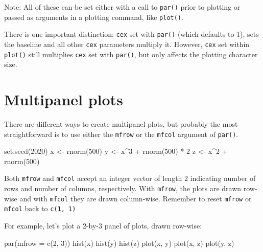 \documentclass[
]{book}
\newenvironment{Shaded}{\begin{snugshade}}{\end{snugshade}}
\newcommand{\AttributeTok}[1]{\textcolor[rgb]{0.77,0.63,0.00}{#1}}
\newcommand{\DecValTok}[1]{\textcolor[rgb]{0.00,0.00,0.81}{#1}}
\newcommand{\FunctionTok}[1]{\textcolor[rgb]{0.00,0.00,0.00}{#1}}
\newcommand{\NormalTok}[1]{#1}
\newcommand{\OtherTok}[1]{\textcolor[rgb]{0.56,0.35,0.01}{#1}}
\newcommand{\SpecialCharTok}[1]{\textcolor[rgb]{0.00,0.00,0.00}{#1}}
\begin{document}
Note: All of these can be set either with a call to \texttt{par()} prior to plotting or passed as arguments in a plotting command, like \texttt{plot()}.

There is one important distinction: \texttt{cex} set with \texttt{par()} (which defaults to 1), sets the baseline and all other \texttt{cex} parameters multiply it. However, \texttt{cex} set within \texttt{plot()} still multiplies \texttt{cex} set with \texttt{par()}, but only affects the plotting character size.

\hypertarget{multipanel-plots}{%
\section{Multipanel plots}\label{multipanel-plots}}

There are different ways to create multipanel plots, but probably the most straightforward is to use either the \texttt{mfrow} or the \texttt{mfcol} argument of \texttt{par()}.

\begin{Shaded}
\begin{Highlighting}[]
\FunctionTok{set.seed}\NormalTok{(}\DecValTok{2020}\NormalTok{)}
\NormalTok{x }\OtherTok{\textless{}{-}} \FunctionTok{rnorm}\NormalTok{(}\DecValTok{500}\NormalTok{)}
\NormalTok{y }\OtherTok{\textless{}{-}}\NormalTok{ x}\SpecialCharTok{\^{}}\DecValTok{3} \SpecialCharTok{+} \FunctionTok{rnorm}\NormalTok{(}\DecValTok{500}\NormalTok{) }\SpecialCharTok{*} \DecValTok{2}
\NormalTok{z }\OtherTok{\textless{}{-}}\NormalTok{ x}\SpecialCharTok{\^{}}\DecValTok{2} \SpecialCharTok{+} \FunctionTok{rnorm}\NormalTok{(}\DecValTok{500}\NormalTok{)}
\end{Highlighting}
\end{Shaded}

Both \texttt{mfrow} and \texttt{mfcol} accept an integer vector of length 2 indicating number of rows and number of columns, respectively. With \texttt{mfrow}, the plots are drawn row-wise and with \texttt{mfcol} they are drawn column-wise. Remember to reset \texttt{mfrow} or \texttt{mfcol} back to \texttt{c(1,\ 1)}

For example, let's plot a 2-by-3 panel of plots, drawn row-wise:

\begin{Shaded}
\begin{Highlighting}[]
\FunctionTok{par}\NormalTok{(}\AttributeTok{mfrow =} \FunctionTok{c}\NormalTok{(}\DecValTok{2}\NormalTok{, }\DecValTok{3}\NormalTok{))}
\FunctionTok{hist}\NormalTok{(x)}
\FunctionTok{hist}\NormalTok{(y)}
\FunctionTok{hist}\NormalTok{(z)}
\FunctionTok{plot}\NormalTok{(x, y)}
\FunctionTok{plot}\NormalTok{(x, z)}
\FunctionTok{plot}\NormalTok{(y, z)}
\end{Highlighting}
\end{Shaded}
\end{document}
